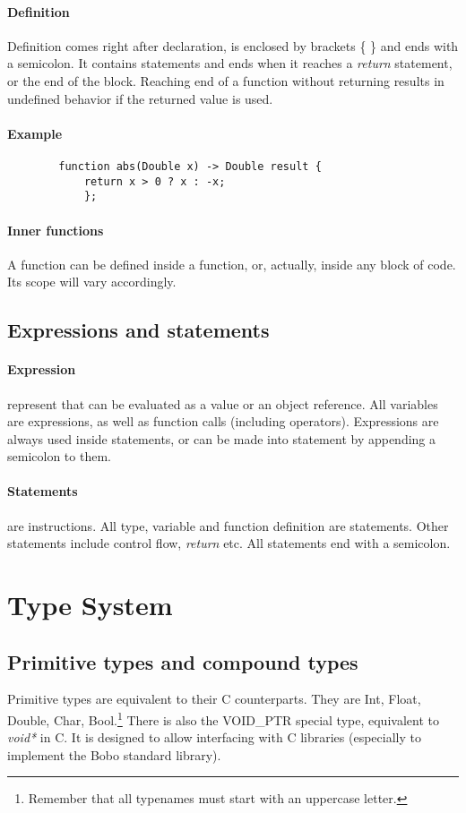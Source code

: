\documentclass[a4paper, 12pt]{article}
\begin{document}
	\paragraph{Definition}
	Definition comes right after declaration, is enclosed by brackets \{ \} and ends with a semicolon. It contains statements and ends when it reaches a \textit{return} statement, or the end of the block. Reaching end of a function without returning results in undefined behavior if the returned value is used.
	
	\paragraph{Example} 
	\begin{verbatim}
		function abs(Double x) -> Double result {
		    return x > 0 ? x : -x;
		    };	
	\end{verbatim}
	
	\paragraph{Inner functions}
	A function can be defined inside a function, or, actually, inside any block of code. Its scope will vary accordingly.
	
	
	\subsection{Expressions and statements}
	\paragraph{Expression} represent that can be evaluated as a value or an object reference. All variables are expressions, as well as function calls (including operators). Expressions are always used inside statements, or can be made into statement by appending a semicolon to them.
	
	\paragraph{Statements} are instructions. All type, variable and function definition are statements. Other statements include control flow, \textit{return} etc. All statements end with a semicolon.
	
	\newpage
	\section{Type System}
	\subsection{Primitive types and compound types}
	Primitive types are equivalent to their C counterparts. They are Int, Float, Double, Char, Bool.\footnote{Remember that all typenames must start with an uppercase letter.} There is also the  VOID\_PTR special type, equivalent to \textit{void*} in C. It is designed to allow interfacing with C libraries (especially to implement the Bobo standard library).
	
\end{document}
